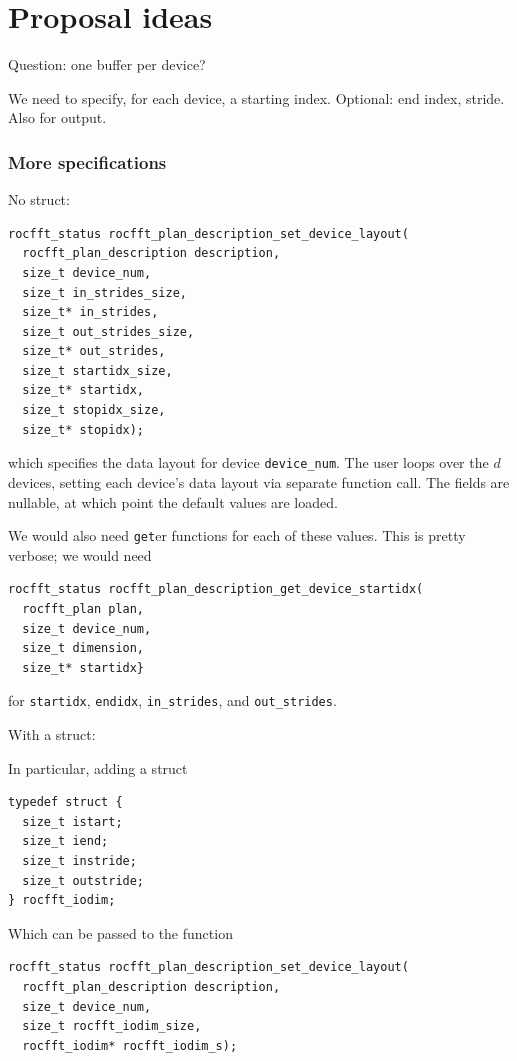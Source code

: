 \documentclass[12pt]{article}
\renewcommand{\(}{\left(}
\renewcommand{\)}{\right)}
\begin{document}
\section{Proposal ideas}

Question: one buffer per device?

We need to specify, for each device, a starting index. Optional: end
index, stride.  Also for output.

\subsubsection{More specifications}


No struct: 
\begin{lstlisting}
rocfft_status rocfft_plan_description_set_device_layout(
  rocfft_plan_description description,
  size_t device_num,
  size_t in_strides_size,
  size_t* in_strides,
  size_t out_strides_size,
  size_t* out_strides,
  size_t startidx_size,
  size_t* startidx,
  size_t stopidx_size,
  size_t* stopidx);
\end{lstlisting}
which specifies the data layout for device \lstinline{device_num}.
The user loops over the $d$ devices, setting each device's data layout
via separate function call.  The fields are nullable, at which point
the default values are loaded.

We would also need \lstinline{get}er functions for each of these
values.  This is pretty verbose; we would need 

\begin{lstlisting}
rocfft_status rocfft_plan_description_get_device_startidx(
  rocfft_plan plan,
  size_t device_num,
  size_t dimension,
  size_t* startidx}
\end{lstlisting}
for \lstinline{startidx}, \lstinline{endidx}, \lstinline{in_strides},
and \lstinline{out_strides}.

With a struct:

In particular, adding a struct
\begin{lstlisting}
typedef struct {
  size_t istart;
  size_t iend;
  size_t instride;
  size_t outstride;
} rocfft_iodim;
\end{lstlisting}
Which can be passed to the function 
\begin{lstlisting}
rocfft_status rocfft_plan_description_set_device_layout(
  rocfft_plan_description description,
  size_t device_num,
  size_t rocfft_iodim_size,
  rocfft_iodim* rocfft_iodim_s);
\end{lstlisting}
\end{document}
